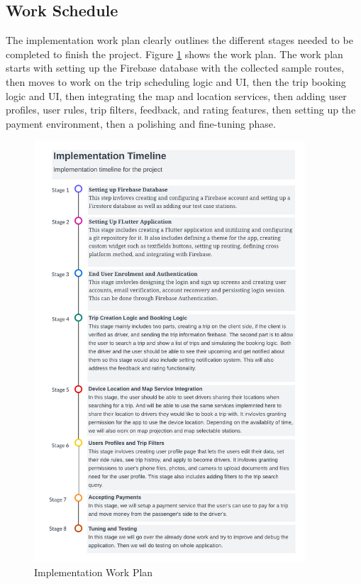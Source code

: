 \documentclass[a4paper, 12pt]{report} %
\begin{document}
        \subsection{Work Schedule}
            The implementation work plan clearly outlines the different stages needed to be completed to finish the project. Figure \ref{fig:work_plan} shows the work plan. The work plan starts with setting up the Firebase database with the collected sample routes, then moves to work on the trip scheduling logic and UI, then the trip booking logic and UI, then integrating the map and location services, then adding user profiles, user rules, trip filters, feedback, and rating features, then setting up the payment environment, then a polishing and fine-tuning phase.
            \begin{figure}[H]
                \centering
                \includegraphics[width=0.9\textwidth]{Images/implemntation_timeline.png}
                \caption{Implementation Work Plan}
                \label{fig:work_plan}
            \end{figure}
        
\end{document}
